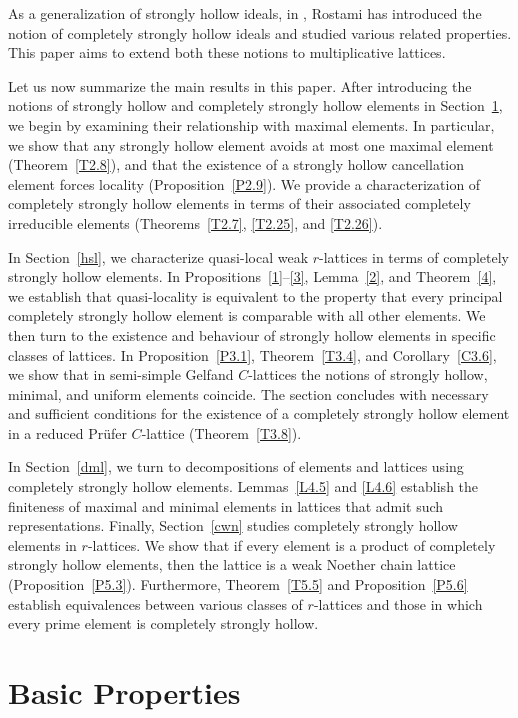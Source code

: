 \documentclass[11pt,english]{amsart}
\theoremstyle{definition}
\numberwithin{equation}{section}
\theoremstyle{remark}
\begin{document}
	As a generalization of strongly hollow ideals, in \cite{Ros21}, Rostami has introduced the notion of completely strongly hollow ideals and studied various related properties. This paper aims to extend both these notions to multiplicative lattices. 
	
	Let us now summarize the main results in this paper. After introducing the notions of strongly hollow and completely strongly hollow elements in Section~\ref{bp}, we begin by examining their relationship with maximal elements. In particular, we show that any strongly hollow element avoids at most one maximal element (Theorem~\ref{T2.8}), and that the existence of a strongly hollow cancellation element forces locality (Proposition~\ref{P2.9}). 
	We provide a characterization of completely strongly hollow elements in terms of their associated completely irreducible elements (Theorems~\ref{T2.7}, \ref{T2.25}, and \ref{T2.26}). 
	
	In Section~\ref{hsl}, we characterize quasi-local weak $r$-lattices in terms of completely strongly hollow elements. In Propositions~\ref{1}–\ref{3}, Lemma~\ref{2}, and Theorem~\ref{4}, we establish that quasi-locality is equivalent to the property that every principal completely strongly hollow element is comparable with all other elements. We then turn to the existence and behaviour of strongly hollow elements in specific classes of lattices. In Proposition~\ref{P3.1}, Theorem~\ref{T3.4}, and Corollary~\ref{C3.6}, we show that in semi-simple Gelfand $C$-lattices the notions of strongly hollow, minimal, and uniform elements coincide. The section concludes with necessary and sufficient conditions for the existence of a completely strongly hollow element in a reduced Pr\"ufer $C$-lattice (Theorem~\ref{T3.8}).
	
	In Section~\ref{dml}, we turn to decompositions of elements and lattices using completely strongly hollow elements. Lemmas~\ref{L4.5} and \ref{L4.6} establish the finiteness of maximal and minimal elements in lattices that admit such representations.
	Finally, Section~\ref{cwn} studies completely strongly hollow elements in $r$-lattices. We show that if every element is a product of completely strongly hollow elements, then the lattice is a weak Noether chain lattice (Proposition~\ref{P5.3}). Furthermore, Theorem~\ref{T5.5} and Proposition~\ref{P5.6} establish equivalences between various classes of $r$-lattices and those in which every prime element is completely strongly hollow.
	
	\section{Basic Properties}
	\label{bp}
	
\end{document}

